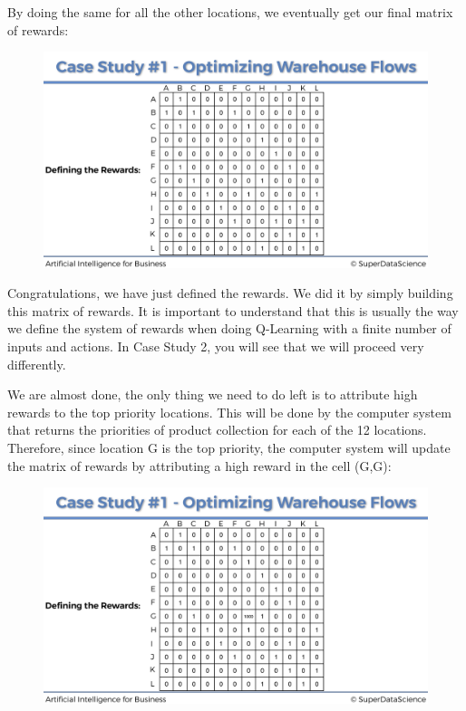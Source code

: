 \documentclass[]{book}
\begin{document}
By doing the same for all the other locations, we eventually get our final matrix of rewards:

\begin{figure}[!htbp]
        \begin{center}
            \includegraphics[scale=0.14]{Rewards_Matrix_4.png}
        \end{center}
\end{figure}

Congratulations, we have just defined the rewards. We did it by simply building this matrix of rewards. It is important to understand that this is usually the way we define the system of rewards when doing Q-Learning with a finite number of inputs and actions. In Case Study 2, you will see that we will proceed very differently.

We are almost done, the only thing we need to do left is to attribute high rewards to the top priority locations. This will be done by the computer system that returns the priorities of product collection for each of the 12 locations. Therefore, since location G is the top priority, the computer system will update the matrix of rewards by attributing a high reward in the cell (G,G):

\begin{figure}[!htbp]
        \begin{center}
            \includegraphics[scale=0.14]{Rewards_Matrix_5.png}
        \end{center}
\end{figure}
\end{document}
